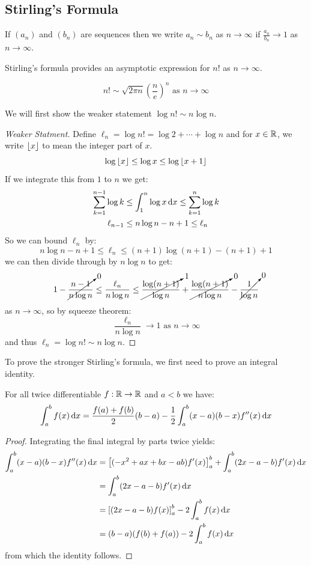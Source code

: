 \documentclass[../main.tex]{subfiles}
\begin{document}
\subsection{Stirling's Formula}
\begin{remark}
  If $(a_n)$ and $(b_n)$ are sequences then we write $a_n \sim b_n$ as $n \to \infty$ if $\frac{a_n}{b_n} \to 1$ as $n \to \infty$.
\end{remark}
Stirling's formula provides an asymptotic expression for $n!$ as $n \to \infty$.
\begin{theorem}
  \[
    n! \sim \sqrt{2\pi n} \left(\frac{n}{e}\right)^n \text{ as $n \to \infty$}
  \]
  \label{stirling}
\end{theorem}
We will first show the weaker statement $\log n! \sim n \log n$.
\begin{proof}[Weaker Statment]
  Define $\ell_n = \log n! = \log 2 + \cdots + \log n$ and for $x \in \mathbb{R}$, we write $\left\lfloor x \right\rfloor$ to mean the integer part of $x$.
  \[
    \log \left\lfloor x \right\rfloor \leq \log x \leq \log \left\lfloor x + 1 \right\rfloor
  \]
  If we integrate this from $1$ to $n$ we get:
  \begin{align*}
    \sum_{k = 1}^{n - 1} \log k &\leq \int_{1}^{n} \log x \d{x} \leq \sum_{k = 1}^{n} \log k \\
    \ell_{n - 1} &\leq n \log n - n + 1 \leq \ell_{n}
\end{align*}
So we can bound $\ell_n$ by:
\[
  n \log n - n + 1 \leq \ell_n \leq (n + 1) \log(n + 1) - (n + 1) + 1
\]
we can then divide through by $n \log n$ to get:
\[
  1 - \cancelto{0}{\frac{n - 1}{n \log n}} \leq \frac{\ell_n}{n \log n} \leq \cancelto{1}{\frac{\log (n + 1)}{\log n}} + \cancelto{0}{\frac{\log(n + 1)}{n \log n}} - \cancelto{0}{\frac{1}{\log n}}
\]
as $n \to \infty$, so by squeeze theorem:
\[
  \frac{\ell_n}{n \log n} \to 1 \text{ as $n \to \infty$}
\]
and thus $\ell_n = \log n! \sim n \log n$.
\end{proof}
\nonexaminable
To prove the stronger Stirling's formula, we first need to prove an integral identity.
\begin{lemma}
  For all twice differentiable $f : \mathbb{R} \to \mathbb{R}$ and $a < b$ we have:
  \label{integralIdentity}
  \[
    \int_{a}^{b} f(x)\d{x} = \frac{f(a) + f(b)}{2}(b - a) - \frac{1}{2}\int_{a}^{b} (x - a)(b - x)f''(x) \d{x}
  \]
\end{lemma}
\begin{proof}
  Integrating the final integral by parts twice yields:
  \begin{align*}
    \int_{a}^{b} (x - a)(b - x) f''(x) \d{x} &= \eval{(-x^2 + ax + bx - ab)f'(x)}{a}{b} + \int_{a}^{b} (2x - a - b)f'(x) \d{x} \\
                                             &= \int_{a}^{b} (2x - a - b)f'(x) \d{x} \\
                                             &= \eval{(2x - a - b)f(x)}{a}{b} - 2 \int_{a}^{b} f(x) \d{x} \\
                                             &= (b - a)(f(b) + f(a)) - 2 \int_{a}^{b} f(x) \d{x}
  \end{align*}
  from which the identity follows.
\end{proof}
\end{document}
